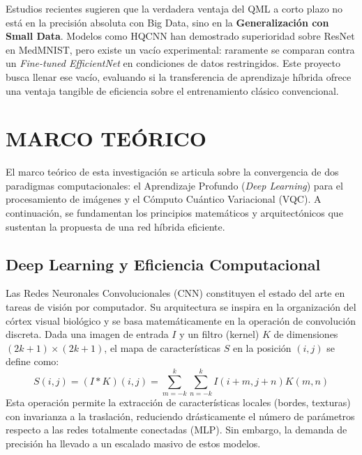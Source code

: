 \documentclass[12pt,letterpaper]{article}
\begin{document}
    Estudios recientes sugieren que la verdadera ventaja del QML a corto plazo no está en la precisión absoluta con Big Data, sino en la \textbf{Generalización con Small Data}. Modelos como HQCNN \citep{shahjalal2025hqcnn} han demostrado superioridad sobre ResNet en MedMNIST, pero existe un vacío experimental: raramente se comparan contra un \textit{Fine-tuned EfficientNet} en condiciones de datos restringidos. Este proyecto busca llenar ese vacío, evaluando si la transferencia de aprendizaje híbrida ofrece una ventaja tangible de eficiencia sobre el entrenamiento clásico convencional.

    \newpage
    \section{MARCO TEÓRICO}
    \vspace{-0.5cm}

    El marco teórico de esta investigación se articula sobre la convergencia de dos paradigmas computacionales: el Aprendizaje Profundo (\textit{Deep Learning}) para el procesamiento de imágenes y el Cómputo Cuántico Variacional (VQC). A continuación, se fundamentan los principios matemáticos y arquitectónicos que sustentan la propuesta de una red híbrida eficiente.

    \subsection{Deep Learning y Eficiencia Computacional}
    \vspace{-0.5cm}
    Las Redes Neuronales Convolucionales (CNN) constituyen el estado del arte en tareas de visión por computador. Su arquitectura se inspira en la organización del córtex visual biológico y se basa matemáticamente en la operación de convolución discreta. Dada una imagen de entrada $I$ y un filtro (kernel) $K$ de dimensiones $(2k+1) \times (2k+1)$, el mapa de características $S$ en la posición $(i, j)$ se define como:
    \begin{equation}
        S(i, j) = (I * K)(i, j) = \sum_{m=-k}^{k} \sum_{n=-k}^{k} I(i+m, j+n) K(m, n)
    \end{equation}
    Esta operación permite la extracción de características locales (bordes, texturas) con invarianza a la traslación, reduciendo drásticamente el número de parámetros respecto a las redes totalmente conectadas (MLP). Sin embargo, la demanda de precisión ha llevado a un escalado masivo de estos modelos.
\end{document}
